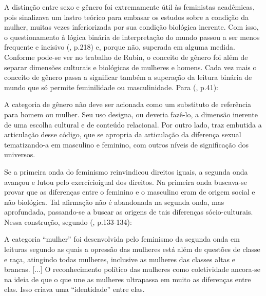 A distinção entre sexo e gênero foi extremamente útil às feministas acadêmicas, pois sinalizava um lastro teórico para embasar os estudos sobre a condição da mulher, muitas vezes inferiorizada por sua condição biológica inerente. Com isso, o questionamento à lógica binária de interpretação do mundo passou a ser menos frequente e incisivo  (\citeyear{HARAWAY2004}, p.218) e, porque não, superada em alguma medida. Conforme pode-se ver no trabalho de Rubin, o conceito de gênero foi além de separar dimensões culturais e biológicas de mulheres e homens. Cada vez mais o conceito de gênero passa a significar também a superação da leitura binária de mundo que só permite feminilidade ou masculinidade. Para  (\citeyear{HEILBORN1992}, p.41):

\begin{citacao}
A categoria de gênero não deve ser acionada como um substituto de referência para homem ou mulher. Seu uso designa, ou deveria fazê-lo, a dimensão inerente de uma escolha cultural e de conteúdo relacional. Por outro lado, traz embutida a articulação desse código, que se apropria da articulação da diferença sexual tematizando-a em masculino e feminino, com outros níveis de significação dos universos.
\end{citacao}

Se a primeira onda do feminismo reinvindicou direitos iguais, a segunda onda avançou e lutou pelo exercícioigual dos direitos. Na primeira onda buscava-se provar que as diferenças entre o feminino e o masculino eram de origem social e não biológica. Tal afirmação não é abandonada na segunda onda, mas aprofundada, passando-se a buscar as origens de tais diferenças sócio-culturais. Nessa construção, segundo  (\citeyear{PISCITELLI2009}, p.133-134):

\begin{citacao}
A categoria ``mulher'' foi desenvolvida pelo feminismo da segunda onda em leituras segundo as quais a opressão das mulheres está além de questões de classe e raça, atingindo todas mulheres, inclusive as mulheres das classes altas e brancas. [...] O reconhecimento político das mulheres como coletividade ancora-se na ideia de que o que une as mulheres ultrapassa em muito as diferenças entre elas. Isso criava uma ``identidade'' entre elas.
\end{citacao}

